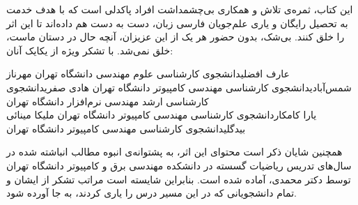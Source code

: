 \newpage
\thispagestyle{empty}

\scriptsize{
\p
این کتاب، ثمره‌ی تلاش و همکاری بی‌چشمداشت افراد پاکدلی است
که با هدف خدمت به تحصیل رایگان و یاری علم‌جویان فارسی زبان،
دست به دست هم داده‌اند تا این اثر را خلق کنند.
بی‌شک، بدون حضور هر یک از این عزیزان، آنچه حال در دستان ماست،
خلق نمی‌شد. با تشکر ویژه از یکایک آنان:
}

\scriptsize{
    \begin{AFFILIATIONS}
        \AFFILIATIONROW
        {عارف افضلی}{دانشجوی کارشناسی علوم مهندسی دانشگاه تهران}{}
        {مهرناز شمس‌آبادی}{دانشجوی کارشناسی مهندسی کامپیوتر دانشگاه تهران}{}
        {هادی صفری}{دانشجوی کارشناسی ارشد مهندسی نرم‌افزار دانشگاه تهران}{}
        \\\AFFILIATIONROW
        {یارا کامکار}{دانشجوی کارشناسی مهندسی کامپیوتر دانشگاه تهران}{}
        {ملیکا مینائی بیدگلی}{دانشجوی کارشناسی مهندسی کامپیوتر دانشگاه تهران}{}
        {}{}{}
    \end{AFFILIATIONS}
}

\scriptsize{
\p
همچنین شایان ذکر است محتوای این اثر،
به پشتوانه‌ی انبوه مطالب انباشته شده در سال‌های تدریس ریاضیات گسسته
در دانشکده مهندسی برق و کامپیوتر دانشگاه تهران
توسط دکتر محمدی، آماده شده است.
بنابراین شایسته است مراتب تشکر از ایشان و تمام دانشجویانی که در این مسیر
درس را یاری کردند، به جا آورده شود.
}
